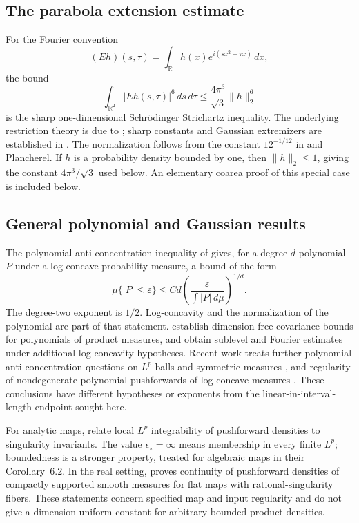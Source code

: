 \subsection{The parabola extension estimate}

For the Fourier convention
\[
 (E h)(s,\tau)=\int_{\mathbb R}h(x)e^{i(sx^2+\tau x)}\,dx,
\]
the bound
\[
 \int_{\mathbb R^2}|E h(s,\tau)|^6\,ds\,d\tau
 \leq\frac{4\pi^3}{\sqrt3}\|h\|_2^6
\]
is the sharp one-dimensional Schr\"odinger Strichartz inequality. The underlying restriction theory is due to \citet{Strichartz1977}; sharp constants and Gaussian extremizers are established in \citet{Foschi2007,HZ2006}. The normalization follows from the constant $12^{-1/12}$ in \citet[Theorem~1.1]{Foschi2007} and Plancherel. If $h$ is a probability density bounded by one, then $\|h\|_2\leq1$, giving the constant $4\pi^3/\sqrt3$ used below. An elementary coarea proof of this special case is included below.

\subsection{General polynomial and Gaussian results}

The polynomial anti-concentration inequality of \citet{CW2001} gives, for a degree-$d$ polynomial $P$ under a log-concave probability measure, a bound of the form
\[
 \mu\{|P|\leq\varepsilon\}
 \leq C d\left(\frac{\varepsilon}{\int |P|\,d\mu}\right)^{1/d}.
\]
The degree-two exponent is $1/2$. Log-concavity and the normalization of the polynomial are part of that statement. \citet{GM2022} establish dimension-free covariance bounds for polynomials of product measures, and obtain sublevel and Fourier estimates under additional log-concavity hypotheses. Recent work treats further polynomial anti-concentration questions on $L^p$ balls and symmetric measures \citep{GM2026}, and regularity of nondegenerate polynomial pushforwards of log-concave measures \citep{KZ2026}. These conclusions have different hypotheses or exponents from the linear-in-interval-length endpoint sought here.

For analytic maps, \citet[Theorems~1.1--1.2]{GHS2026} relate local $L^p$ integrability of pushforward densities to singularity invariants. The value $\epsilon_\star=\infty$ means membership in every finite $L^p$; boundedness is a stronger property, treated for algebraic maps in their Corollary~6.2. In the real setting, \citet{Reiser2018} proves continuity of pushforward densities of compactly supported smooth measures for flat maps with rational-singularity fibers. These statements concern specified map and input regularity and do not give a dimension-uniform constant for arbitrary bounded product densities.

